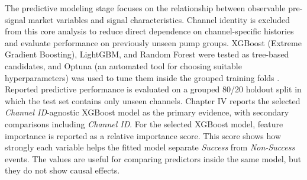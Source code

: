 The predictive modeling stage focuses on the relationship between observable pre-signal market variables and signal characteristics. Channel identity is excluded from this core analysis to reduce direct dependence on channel-specific histories and evaluate performance on previously unseen pump groups. XGBoost (Extreme Gradient Boosting), LightGBM, and Random Forest were tested as tree-based candidates, and Optuna (an automated tool for choosing suitable hyperparameters) was used to tune them inside the grouped training folds \cite{xgboost2016, lightgbm2017, breiman2001random, optuna2019}. Reported predictive performance is evaluated on a grouped 80/20 holdout split in which the test set contains only unseen channels. Chapter IV reports the selected \textit{Channel ID}-agnostic XGBoost model as the primary evidence, with secondary comparisons including \textit{Channel ID}. For the selected XGBoost model, feature importance is reported as a relative importance score. This score shows how strongly each variable helps the fitted model separate \textit{Success} from \textit{Non-Success} events. The values are useful for comparing predictors inside the same model, but they do not show causal effects.
